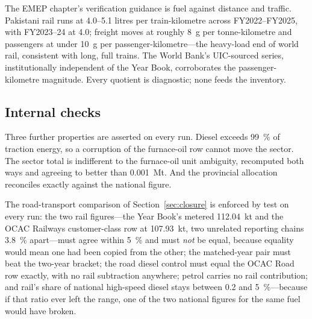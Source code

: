 The EMEP chapter's verification guidance is fuel against distance and traffic. Pakistani
rail runs at \numrange{4.0}{5.1} litres per train-kilometre across FY2022--FY2025, with
FY2023--24 at \num{4.0}; freight moves at roughly \SI{8}{\gram} \COtwo{} per
tonne-kilometre and passengers at under \SI{10}{\gram} per passenger-kilometre---the
heavy-load end of world rail, consistent with long, full trains. The World Bank's
UIC-sourced series, institutionally independent of the Year Book, corroborates the
passenger-kilometre magnitude. Every quotient is diagnostic; none feeds the inventory.

\subsection{Internal checks}

Three further properties are asserted on every run. Diesel exceeds \SI{99}{\percent} of
traction energy, so a corruption of the furnace-oil row cannot move the sector. The sector
total is indifferent to the furnace-oil unit ambiguity, recomputed both ways and agreeing to
better than \SI{0.001}{\mega\tonne}. And the provincial allocation reconciles exactly against
the national figure.

The road-transport comparison of Section~\ref{sec:closure} is enforced by test on every run:
the two rail figures---the Year Book's metered \SI{112.04}{\kilo\tonne} and the OCAC Railways
customer-class row at \SI{107.93}{\kilo\tonne}, two unrelated reporting chains
\SI{3.8}{\percent} apart---must agree within \SI{5}{\percent} and must \emph{not} be equal,
because equality would mean one had been copied from the other; the matched-year pair must
beat the two-year bracket; the road diesel control must equal the OCAC Road row exactly, with
no rail subtraction anywhere; petrol carries no rail contribution; and rail's share of
national high-speed diesel stays between \num{0.2} and \SI{5}{\percent}---because if that
ratio ever left the range, one of the two national figures for the same fuel would have
broken.
